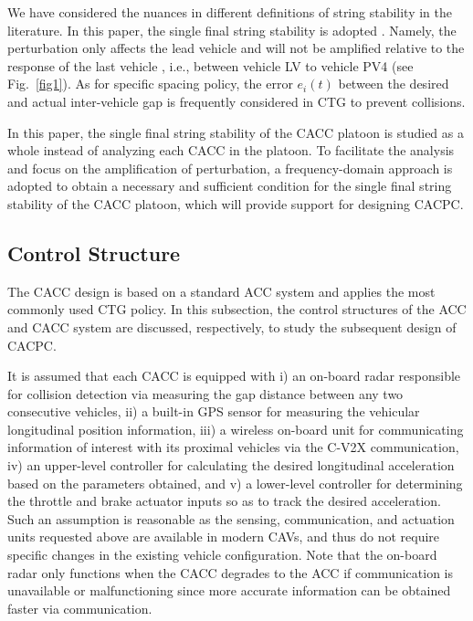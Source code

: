 \documentclass[journal]{IEEEtran}
\begin{document}
We have considered the nuances in different definitions of string stability in the literature. In this paper, the single final string stability is adopted \citep{studli2017vehicular}. Namely, the perturbation only affects the lead vehicle and will not be amplified relative to the response of the last vehicle \citep{qin2021analytical,montanino2021homogeneous,jin2014dynamics,zhou2020stabilizing,wang2018infrastructure}, i.e., between vehicle LV to vehicle PV4 (see Fig.~\ref{fig1}). As for specific spacing policy, the error $e_i (t)$ between the desired and actual inter-vehicle gap is frequently considered in CTG to prevent collisions.

In this paper, the single final string stability of the CACC platoon is studied as a whole instead of analyzing each CACC in the platoon. To facilitate the analysis and focus on the amplification of perturbation, a frequency-domain approach is adopted to obtain a necessary and sufficient condition for the single final string stability of the CACC platoon, which will provide support for designing CACPC.

\subsection{Control Structure}
\label{Section 2.3}
The CACC design is based on a standard ACC system and applies the most commonly used CTG policy. In this subsection, the control structures of the ACC and CACC system are discussed, respectively, to study the subsequent design of CACPC.

It is assumed that each CACC is equipped with i) an on-board radar responsible for collision detection via measuring the gap distance between any two consecutive vehicles, ii) a built-in GPS sensor for measuring the vehicular longitudinal position information, iii) a wireless on-board unit for communicating information of interest with its proximal vehicles via the C-V2X communication, iv) an upper-level controller for calculating the desired longitudinal acceleration based on the parameters obtained, and v) a lower-level controller for determining the throttle and brake actuator inputs so as to track the desired acceleration. Such an assumption is reasonable as the sensing, communication, and actuation units requested above are available in modern CAVs, and thus do not require specific changes in the existing vehicle configuration. Note that the on-board radar only functions when the CACC degrades to the ACC if communication is unavailable or malfunctioning since more accurate information can be obtained faster via communication.
\end{document}
